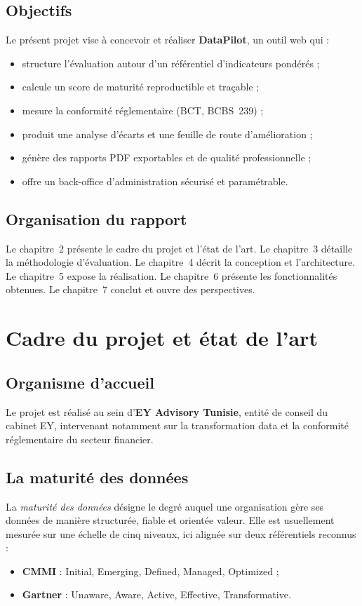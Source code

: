 \documentclass[11pt,a4paper]{report}
\begin{document}
\section{Objectifs}
Le présent projet vise à concevoir et réaliser \textbf{DataPilot}, un outil web
qui :
\begin{itemize}[noitemsep]
  \item structure l'évaluation autour d'un référentiel d'indicateurs pondérés ;
  \item calcule un score de maturité reproductible et traçable ;
  \item mesure la conformité réglementaire (BCT, BCBS~239) ;
  \item produit une analyse d'écarts et une feuille de route d'amélioration ;
  \item génère des rapports PDF exportables et de qualité professionnelle ;
  \item offre un back-office d'administration sécurisé et paramétrable.
\end{itemize}

\section{Organisation du rapport}
Le chapitre~2 présente le cadre du projet et l'état de l'art. Le chapitre~3
détaille la méthodologie d'évaluation. Le chapitre~4 décrit la conception et
l'architecture. Le chapitre~5 expose la réalisation. Le chapitre~6 présente les
fonctionnalités obtenues. Le chapitre~7 conclut et ouvre des perspectives.

\chapter{Cadre du projet et état de l'art}

\section{Organisme d'accueil}
Le projet est réalisé au sein d'\textbf{EY Advisory Tunisie}, entité de conseil
du cabinet EY, intervenant notamment sur la transformation data et la conformité
réglementaire du secteur financier.

\section{La maturité des données}
La \emph{maturité des données} désigne le degré auquel une organisation gère ses
données de manière structurée, fiable et orientée valeur. Elle est usuellement
mesurée sur une échelle de cinq niveaux, ici alignée sur deux référentiels
reconnus :
\begin{itemize}[noitemsep]
  \item \textbf{CMMI} : Initial, Emerging, Defined, Managed, Optimized ;
  \item \textbf{Gartner} : Unaware, Aware, Active, Effective, Transformative.
\end{itemize}
\end{document}
